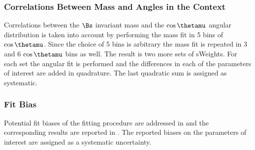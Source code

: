 \subsubsection{Correlations Between Mass and Angles in the \sPlot Context}
\label{systCorrs}
Correlations between the $\Bs$ invariant mass and the $\cos\thetamu$ angular distribution is taken into account
by performing the mass fit in 5 bins of $\cos\thetamu$. Since the choice of 5 bins is arbitrary the mass fit is
repeated in 3 and 6 $\cos\thetamu$ bins as well. The result is two more sets of sWeights. For each set the angular
fit is performed and the differences in each of the parameters of interest are added in quadrature. The last quadratic
sum is assigned as systematic.

\subsubsection{Fit Bias}
\label{systFitBias}
Potential fit biases of the fitting procedure are addressed in  and the corresponding
results are reported in . The reported biases on the parameters of interest are assigned as a systematic uncertainty.

